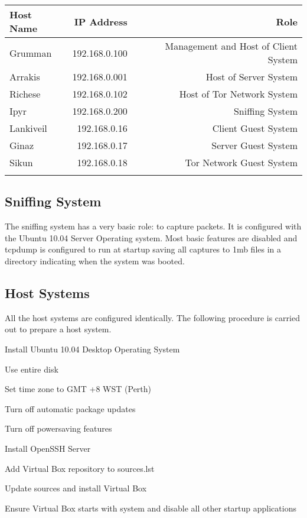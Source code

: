 \begin{tabular}{lrr}
  \toprule
  Host Name & IP Address & Role\\
  \midrule
  Grumman & 192.168.0.100 & Management and Host of Client System \\
  Arrakis & 192.168.0.001 & Host of Server System \\
  Richese & 192.168.0.102 & Host of Tor Network System \\
  \midrule
  Ipyr & 192.168.0.200 & Sniffing System \\
  \midrule
  Lankiveil & 192.168.0.16 & Client Guest System \\
  Ginaz & 192.168.0.17 & Server Guest System \\
  Sikun & 192.168.0.18 & Tor Network Guest System \\
  \botomrule
  \label{table:hosts}
\end{tabular}

\subsection{Sniffing System}

The sniffing system has a very basic role: to capture packets. It is configured with the Ubuntu 10.04 Server Operating system. Most basic features are disabled and tcpdump is configured to run at startup saving all captures to 1mb files in a directory indicating when the system was booted.

\subsection{Host Systems}

All the host systems are configured identically. The following procedure is carried out to prepare a host system.

\begin{itemize*}
  \item Install Ubuntu 10.04 Desktop Operating System
    \begin{itemize*}
      \item Use entire disk
      \item Set time zone to GMT +8 WST (Perth)
    \end{itemize*}
  \item Turn off automatic package updates
  \item Turn off powersaving features
  \item Install OpenSSH Server
  \item Add Virtual Box repository to sources.lst
  \item Update sources and install Virtual Box
  \item Ensure Virtual Box starts with system and disable all other startup applications
\end{itemize*}

